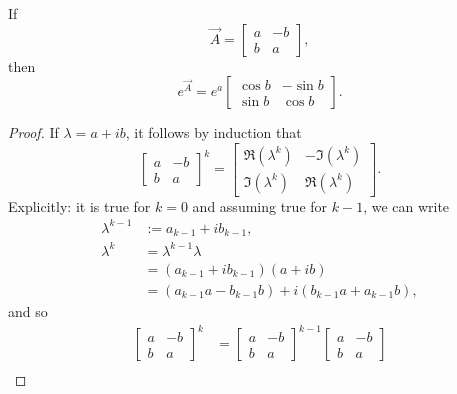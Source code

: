 \begin{proposition} %
	\label{prop:la:complex}
	If
	\begin{equation*}
		\vec A =
			\begin{bmatrix}
				a 	& -b \\
				b 	& a
			\end{bmatrix},
	\end{equation*}
	then
	\begin{equation*}
		e^{\vec A} = e^a
			\begin{bmatrix}
				\cos b 	& -\sin b \\
				\sin b 	& \cos b
			\end{bmatrix}.
	\end{equation*}
\end{proposition}

\begin{proof}
	If $\lambda = a + ib$, it follows by induction that
	\begin{equation*}
		\begin{bmatrix}
			a & -b \\
			b & a
		\end{bmatrix}^k
		= 
		\begin{bmatrix}
			\Re(\lambda^k) & -\Im(\lambda^k) \\
			\Im(\lambda^k) & \Re(\lambda^k)
		\end{bmatrix}.
	\end{equation*}
	Explicitly: it is true for $k = 0$ and assuming true for $k - 1$, we can write
	\begin{align*}
		\lambda^{k - 1} &:= a_{k - 1} + ib_{k - 1}, \\
		\lambda^k 	&= \lambda^{k - 1} \lambda \\
					&= (a_{k - 1} + ib_{k - 1})(a + ib) \\
					&= (a_{k - 1}a - b_{k - 1}b) + i(b_{k - 1}a + a_{k - 1}b),
	\end{align*}
	and so
	\begin{align*}
		\begin{bmatrix}
			a & -b \\
			b & a
		\end{bmatrix}^k
		&=
		\begin{bmatrix}
			a & -b \\
			b & a
		\end{bmatrix}^{k - 1}
		\begin{bmatrix}
			a & -b \\
			b & a
		\end{bmatrix} \\

\end{align*}
\end{proof}
